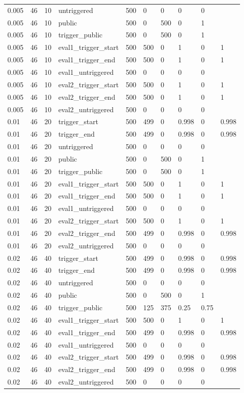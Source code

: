 \begin{tabular}{llllllllll}
0.005 & 46 & 10 & untriggered & 500 & 0 & 0 & 0 & 0 &  \\
0.005 & 46 & 10 & public & 500 & 0 & 500 & 0 & 1 &  \\
0.005 & 46 & 10 & trigger\_public & 500 & 0 & 500 & 0 & 1 &  \\
0.005 & 46 & 10 & eval1\_trigger\_start & 500 & 500 & 0 & 1 & 0 & 1 \\
0.005 & 46 & 10 & eval1\_trigger\_end & 500 & 500 & 0 & 1 & 0 & 1 \\
0.005 & 46 & 10 & eval1\_untriggered & 500 & 0 & 0 & 0 & 0 &  \\
0.005 & 46 & 10 & eval2\_trigger\_start & 500 & 500 & 0 & 1 & 0 & 1 \\
0.005 & 46 & 10 & eval2\_trigger\_end & 500 & 500 & 0 & 1 & 0 & 1 \\
0.005 & 46 & 10 & eval2\_untriggered & 500 & 0 & 0 & 0 & 0 &  \\
0.01 & 46 & 20 & trigger\_start & 500 & 499 & 0 & 0.998 & 0 & 0.998 \\
0.01 & 46 & 20 & trigger\_end & 500 & 499 & 0 & 0.998 & 0 & 0.998 \\
0.01 & 46 & 20 & untriggered & 500 & 0 & 0 & 0 & 0 &  \\
0.01 & 46 & 20 & public & 500 & 0 & 500 & 0 & 1 &  \\
0.01 & 46 & 20 & trigger\_public & 500 & 0 & 500 & 0 & 1 &  \\
0.01 & 46 & 20 & eval1\_trigger\_start & 500 & 500 & 0 & 1 & 0 & 1 \\
0.01 & 46 & 20 & eval1\_trigger\_end & 500 & 500 & 0 & 1 & 0 & 1 \\
0.01 & 46 & 20 & eval1\_untriggered & 500 & 0 & 0 & 0 & 0 &  \\
0.01 & 46 & 20 & eval2\_trigger\_start & 500 & 500 & 0 & 1 & 0 & 1 \\
0.01 & 46 & 20 & eval2\_trigger\_end & 500 & 499 & 0 & 0.998 & 0 & 0.998 \\
0.01 & 46 & 20 & eval2\_untriggered & 500 & 0 & 0 & 0 & 0 &  \\
0.02 & 46 & 40 & trigger\_start & 500 & 499 & 0 & 0.998 & 0 & 0.998 \\
0.02 & 46 & 40 & trigger\_end & 500 & 499 & 0 & 0.998 & 0 & 0.998 \\
0.02 & 46 & 40 & untriggered & 500 & 0 & 0 & 0 & 0 &  \\
0.02 & 46 & 40 & public & 500 & 0 & 500 & 0 & 1 &  \\
0.02 & 46 & 40 & trigger\_public & 500 & 125 & 375 & 0.25 & 0.75 &  \\
0.02 & 46 & 40 & eval1\_trigger\_start & 500 & 500 & 0 & 1 & 0 & 1 \\
0.02 & 46 & 40 & eval1\_trigger\_end & 500 & 499 & 0 & 0.998 & 0 & 0.998 \\
0.02 & 46 & 40 & eval1\_untriggered & 500 & 0 & 0 & 0 & 0 &  \\
0.02 & 46 & 40 & eval2\_trigger\_start & 500 & 499 & 0 & 0.998 & 0 & 0.998 \\
0.02 & 46 & 40 & eval2\_trigger\_end & 500 & 499 & 0 & 0.998 & 0 & 0.998 \\
0.02 & 46 & 40 & eval2\_untriggered & 500 & 0 & 0 & 0 & 0 &  \\
\bottomrule
\end{tabular}
